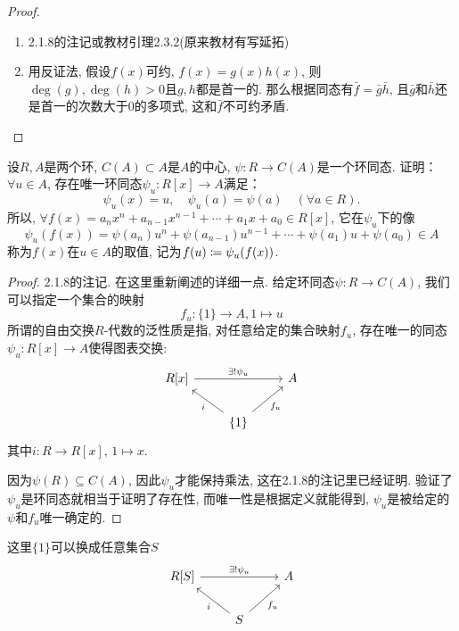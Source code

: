 \documentclass{../solutions-cn}
\begin{document}
\begin{proof}
    \begin{enumerate}[(1)]
        \item 2.1.8的注记或教材引理2.3.2(原来教材有写延拓)
        \item 用反证法, 假设$f(x)$可约, $f(x) = g(x)h(x)$, 则$\deg(g), \deg(h) > 0$且$g, h$都是首一的. 那么根据同态有$\bar{f} = \bar{g}\bar{h}$, 且$\bar{g}$和$\bar{h}$还是首一的次数大于$0$的多项式, 这和$\bar{f}$不可约矛盾.
    \end{enumerate}
\end{proof}

\begin{exercise}[习题2.3.7]
    设$R, A$是两个环, $C(A) \subset A$是$A$的中心,
$\psi:R \to C(A)$是一个环同态. 证明：$\forall u \in A$,
存在唯一环同态$\psi_u:R[x] \to A$满足：
\[
    \psi_u(x) = u,\quad \psi_u(a) = \psi(a) \quad (\forall a \in R).
\]
所以, $\forall f(x) = a_nx^n + a_{n - 1}x^{n - 1} + \cdots + a_1x + a_0 \in R[x]$,
它在$\psi_u$下的像
\[
    \psi_u(f(x)) = \psi(a_n)u^n + \psi(a_{n - 1})u^{n - 1} + \cdots + \psi(a_1)u + \psi(a_0) \in A
\]
称为$f(x)$在$u \in A$的取值, 记为$f(u) \mathrel{\coloneqq} \psi_u(f(x))$.
\end{exercise}

\begin{proof}
    2.1.8的注记. 在这里重新阐述的详细一点. 给定环同态$\psi:R \to C(A)$, 我们可以指定一个集合的映射
    \[
        f_u:\{1\} \to A, 1 \mapsto u
    \]
    所谓的自由交换$R$-代数的泛性质是指, 对任意给定的集合映射$f_u$, 存在唯一的同态$\psi_u:R[x] \to A$使得图表交换:
    \[
        \begin{tikzcd}
            {R[x]} \arrow[rr, "\exists!\psi_u"] &                                          & A \\
                                                & \{1\} \arrow[lu, "i"] \arrow[ru, "f_u"'] &  
        \end{tikzcd}
    \]
    其中$i:R \to R[x],\, 1 \mapsto x$.

    因为$\psi(R) \subseteq C(A)$, 因此$\psi_u$才能保持乘法, 这在2.1.8的注记里已经证明. 验证了$\psi_u$是环同态就相当于证明了存在性, 而唯一性是根据定义就能得到, $\psi_u$是被给定的$\psi$和$f_u$唯一确定的.
\end{proof}

\begin{remark}
    这里$\{1\}$可以换成任意集合$S$
\[
    \begin{tikzcd}
        {R[S]} \arrow[rr, "\exists!\psi_u"] &                                      & A \\
                                            & S \arrow[lu, "i"] \arrow[ru, "f_u"'] &  
        \end{tikzcd}
\]
\end{remark}
\end{document}

